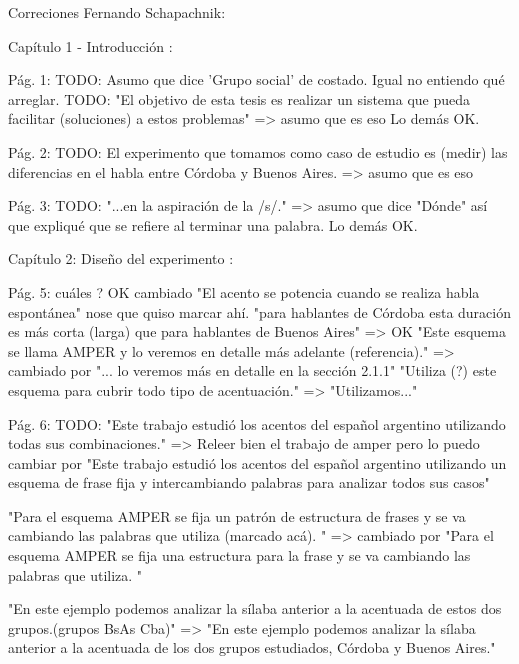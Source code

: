 Correciones Fernando Schapachnik:

Capítulo 1 - Introducción :

Pág. 1:
TODO: Asumo que dice 'Grupo social' de costado. Igual no entiendo qué arreglar.
TODO: "El objetivo de esta tesis es realizar un sistema que pueda facilitar (soluciones) a estos problemas" => asumo que es eso
Lo demás OK. 

Pág. 2:
TODO: El experimento que tomamos como caso de estudio es (medir) las diferencias en el habla entre Córdoba y Buenos Aires. => asumo que es eso

Pág. 3:
TODO: "...en la aspiración de la /s/." => asumo que dice "Dónde" así que expliqué que se refiere al terminar una palabra.
Lo demás OK.

Capítulo 2: Diseño del experimento :

Pág. 5: 
cuáles ? OK cambiado 
"El acento se potencia cuando se realiza habla espontánea" nose que quiso marcar ahí.
"para hablantes de Córdoba esta duración es más corta (larga) que para hablantes de Buenos Aires" => OK
"Este esquema se llama AMPER \cite{amper} y lo veremos en detalle más adelante (referencia)." => cambiado por "... lo veremos más en detalle en la sección 2.1.1"
"Utiliza (?) este esquema para cubrir todo tipo de acentuación." => "Utilizamos..."


Pág. 6:
TODO: "Este trabajo estudió los acentos del español argentino utilizando todas sus combinaciones." => Releer bien el trabajo de amper pero lo puedo cambiar por "Este trabajo estudió los acentos del español argentino utilizando un esquema de frase fija y intercambiando palabras para analizar todos sus casos" 

"Para el esquema AMPER se fija un patrón de estructura de frases y se va cambiando las palabras que utiliza (marcado acá). " => cambiado por "Para el esquema AMPER se fija una estructura para la frase y se va cambiando las palabras que utiliza. " 

"En este ejemplo podemos analizar la sílaba anterior a la acentuada de estos dos grupos.(grupos BsAs Cba)" => "En este ejemplo podemos analizar la sílaba anterior a la acentuada de los dos grupos estudiados, Córdoba y Buenos Aires." 


